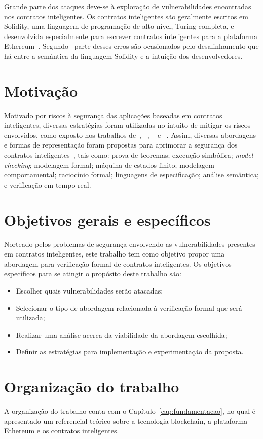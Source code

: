 Grande parte dos ataques deve-se à exploração de vulnerabilidades encontradas nos contratos inteligentes. Os contratos inteligentes são geralmente escritos em Solidity, uma linguagem de programação de alto nível, Turing-completa, e desenvolvida especialmente para escrever contratos inteligentes para a plataforma Ethereum~\cite{varela2021smart-languages-acmcs}. Segundo~ parte desses erros são ocasionados pelo desalinhamento que há entre a semântica da linguagem Solidity e a intuição dos desenvolvedores.

\section{Motivação}

Motivado por riscos à segurança das aplicações baseadas em contratos inteligentes, diversas estratégias foram utilizadas no intuito de mitigar os riscos envolvidos, como exposto nos trabalhos de~, ~, ~ e ~. Assim, diversas abordagens e formas de representação foram propostas para aprimorar a segurança dos contratos inteligentes~\cite{liu2019survey-ieeeaccess, singh2020survey-vulnerabilities-elsevier, chen2020survey-ethereum-acm}, tais como: prova de teoremas; execução simbólica; \textit{model-checking}; modelagem formal; máquina de estados finito; modelagem comportamental; raciocínio formal; linguagens de especificação; análise semântica; e verificação em tempo real.

\section{Objetivos gerais e específicos}

Norteado pelos problemas de segurança envolvendo as vulnerabilidades presentes em contratos inteligentes, este trabalho tem como objetivo propor uma abordagem para verificação formal de contratos inteligentes. Os objetivos específicos para se atingir o propósito deste trabalho são:
\begin{itemize}
    \item Escolher quais vulnerabilidades serão atacadas;
    \item Selecionar o tipo de abordagem relacionada à verificação formal que será utilizada;
    \item Realizar uma análise acerca da viabilidade da abordagem escolhida;
    \item Definir as estratégias para implementação e experimentação da proposta.
\end{itemize}

\section{Organização do trabalho}

A organização do trabalho conta com o Capítulo~\ref{cap:fundamentacao}, no qual é apresentado um referencial teórico sobre a tecnologia blockchain, a plataforma Ethereum e os contratos inteligentes.